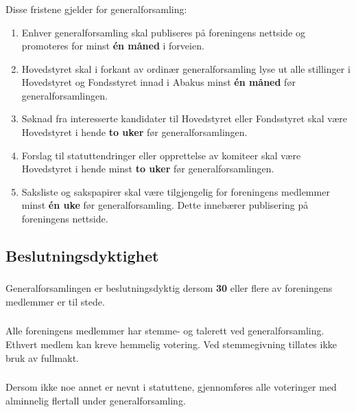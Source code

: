 \subsubsection{}
Disse fristene gjelder for generalforsamling:
\begin{enumerate}[label=\alph*)]
    \item Enhver generalforsamling skal publiseres på foreningens nettside og promoteres for minst \textbf{én måned} i forveien.
    \item Hovedstyret skal i forkant av ordinær generalforsamling lyse ut alle stillinger i Hovedstyret og 
    Fondsstyret innad i Abakus minst \textbf{én måned} før generalforsamlingen. 
    \item Søknad fra interesserte kandidater til Hovedstyret eller Fondsstyret skal være Hovedstyret 
    i hende \textbf{to uker} før generalforsamlingen.
    \item Forslag til statuttendringer eller opprettelse av komiteer skal være Hovedstyret i 
    hende minst \textbf{to uker} før generalforsamlingen. 
    \item Saksliste og sakspapirer skal være tilgjengelig for foreningens medlemmer minst \textbf{én uke} 
    før generalforsamling. Dette innebærer publisering på foreningens nettside.
\end{enumerate}

\subsection{Beslutningsdyktighet}
\subsubsection{}
Generalforsamlingen er beslutningsdyktig dersom \textbf{30} eller flere av foreningens medlemmer er til stede. 

\subsubsection{}
Alle foreningens medlemmer har stemme- og talerett ved generalforsamling. Ethvert medlem kan kreve hemmelig votering. 
Ved stemmegivning tillates ikke bruk av fullmakt. 

\subsubsection{}
Dersom ikke noe annet er nevnt i statuttene, gjennomføres alle voteringer med alminnelig flertall under generalforsamling.

